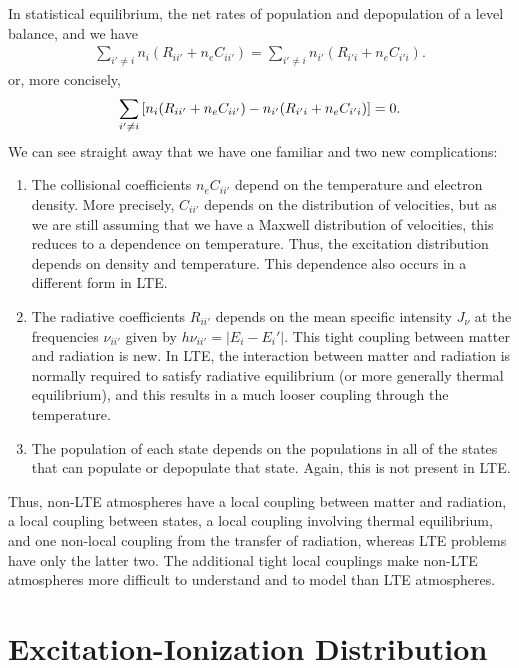 In statistical equilibrium, the net rates of population and depopulation
of a level balance, and we have
\begin{align}
\sum_{i'\ne i} n_i (R_{ii'} + n_e C_{ii'}) = \sum_{i'\ne i} n_{i'} (R_{i'i} +
n_e C_{i'i}).
\end{align}
or, more concisely,
\begin{align}
\sum_{i'\ne i} \left[
n_i (R_{ii'} + n_e C_{ii'}) - n_{i'} (R_{i'i} + n_e C_{i'i})
\right] = 0.
\eqlabel{non-lte-excitation}
\end{align}
We can see straight away that we have one familiar and two new
complications:
\begin{enumerate}
\item 
The collisional coefficients $n_e C_{ii'}$ depend on the temperature and
electron density. More precisely, $C_{ii'}$ depends on the distribution
of velocities, but as we are still assuming that we have a Maxwell
distribution of velocities, this reduces to a dependence on temperature.
Thus, the excitation distribution depends on density and temperature.
This dependence also occurs in a different form in LTE.
\item 
The radiative coefficients $R_{ii'}$ depends on the mean specific
intensity $J_\nu$ at the frequencies $\nu_{ii'}$ given by $h\nu_{ii'} =
|E_i - E_i'|$. This tight coupling between matter and radiation is new.
In LTE, the interaction between matter and radiation is normally
required to satisfy radiative equilibrium (or more generally thermal
equilibrium), and this results in a much looser coupling through the
temperature.
\item 
The population of each state depends on the populations in all of the
states that can populate or depopulate that state. Again, this is not
present in LTE.
\end{enumerate}
Thus, non-LTE atmospheres have a local coupling between matter and
radiation, a local coupling between states, a local coupling involving
thermal equilibrium, and one non-local coupling from the transfer of
radiation, whereas LTE problems have only the latter two. The additional
tight local couplings make non-LTE atmospheres more difficult to
understand and to model than LTE atmospheres.

\newslide

\section{Excitation-Ionization Distribution}

